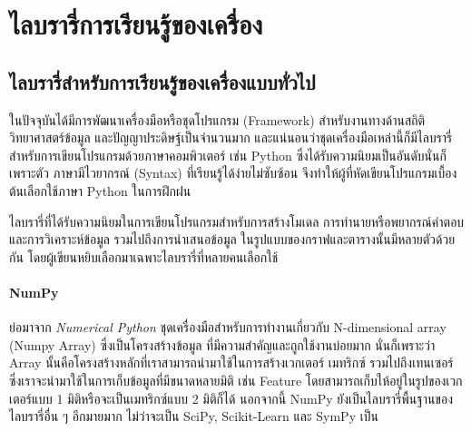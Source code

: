 

\section{ไลบรารี่การเรียนรู้ของเครื่อง}
\label{ap:library_ml}

\subsection{ไลบรารี่สำหรับการเรียนรู้ของเครื่องแบบทั่วไป}

ในปัจจุบันได้มีการพัฒนาเครื่องมือหรือชุดโปรแกรม (Framework) สำหรับงานทางด้านสถิติ วิทยาศาสตร์ข้อมูล และปัญญาประดิษฐ์เป็นจำนวนมาก
และแน่นอนว่าชุดเครื่องมือเหล่านี้ก็มีไลบรารี่สำหรับการเขียนโปรแกรมด้วยภาษาคอมพิวเตอร์ เช่น Python ซึ่งได้รับความนิยมเป็นอันดับนั่นก็เพราะตัว%
ภาษามีไวยากรณ์ (Syntax) ที่เรียนรู้ได้ง่ายไม่ซับซ้อน จึงทำให้ผู้ที่หัดเขียนโปรแกรมเบื้องต้นเลือกใช้ภาษา Python ในการฝึกฝน 

ไลบรารี่ที่ได้รับความนิยมในการเขียนโปรแกรมสำหรับการสร้างโมเดล การทำนายหรือพยากรณ์คำตอบ และการวิเคราะห์ข้อมูล รวมไปถึงการนำเสนอข้อมูล%
ในรูปแบบของกราฟและตารางนั้นมีหลายตัวด้วยกัน โดยผู้เขียนหยิบเลือกมาเฉพาะไลบรารี่ที่หลายคนเลือกใช้

\paragraph{\textbf{NumPy}}
ย่อมาจาก \textit{Numerical Python} ชุดเครื่องมือสำหรับการทำงานเกี่ยวกับ N-dimensional array (Numpy Array) ซึ่งเป็นโครงสร้างข้อมูล%
ที่มีความสำคัญและถูกใช้งานบ่อยมาก นั่นก็เพราะว่า Array นั้นคือโครงสร้างหลักที่เราสามารถนำมาใช้ในการสร้างเวกเตอร์ เมทริกซ์ รวมไปถึงเทนเซอร์
ซึ่งเราจะนำมาใช้ในการเก็บข้อมูลที่มีขนาดหลายมิติ เช่น Feature โดยสามารถเก็บให้อยู่ในรูปของเวกเตอร์แบบ 1 มิติหรือจะเป็นเมทริกซ์แบบ 2 มิติก็ได้
นอกจากนี้ NumPy ยังเป็นไลบรารี่พื้นฐานของไลบรารี่อื่น ๆ อีกมายมาก ไม่ว่าจะเป็น SciPy, Scikit-Learn และ SymPy เป็น

